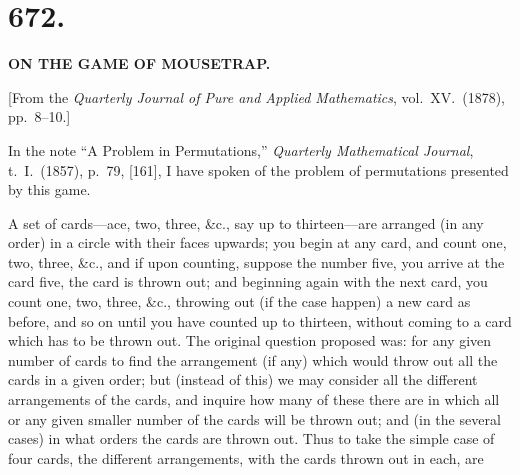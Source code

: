 \documentclass[11pt,a4paper]{article}
\begin{document}
\newpage



\section*{672.}

\begin{center}
\textbf{ON THE GAME OF MOUSETRAP.}
\end{center}

\medskip

\begin{center}
[From the \emph{Quarterly Journal of Pure and Applied Mathematics}, vol.~XV.\ (1878), pp.~8--10.]
\end{center}

\medskip

\noindent In the note ``A Problem in Permutations,'' \emph{Quarterly Mathematical Journal}, t.~I.\ (1857), p.~79, [161], I have spoken of the problem of permutations presented by this game.

\medskip

A set of cards---ace, two, three, \&c., say up to thirteen---are arranged (in any order) in a circle with their faces upwards; you begin at any card, and count one, two, three, \&c., and if upon counting, suppose the number five, you arrive at the card five, the card is thrown out; and beginning again with the next card, you count one, two, three, \&c., throwing out (if the case happen) a new card as before, and so on until you have counted up to thirteen, without coming to a card which has to be thrown out. The original question proposed was: for any given number of cards to find the arrangement (if any) which would throw out all the cards in a given order; but (instead of this) we may consider all the different arrangements of the cards, and inquire how many of these there are in which all or any given smaller number of the cards will be thrown out; and (in the several cases) in what orders the cards are thrown out. Thus to take the simple case of four cards, the different arrangements, with the cards thrown out in each, are

\newpage

\end{document}
